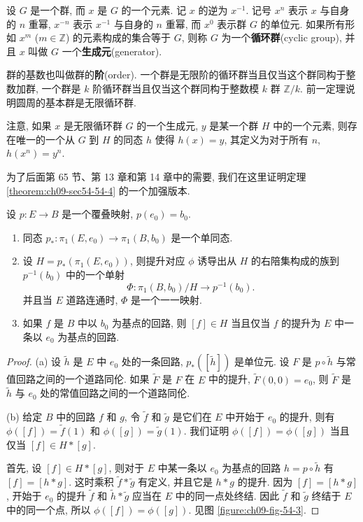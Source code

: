\begin{definition}[循环群]
\label{definition:ch09-sec54-cyclic}
设 $G$ 是一个群, 而 $x$ 是 $G$ 的一个元素. 记 $x$ 的逆为 $x^{-1}$. 记号 $x^n$ 表示 $x$ 与自身的 $n$ 重幂, $x^{-n}$ 表示 $x^{-1}$ 与自身的 $n$ 重幂, 而 $x^0$ 表示群 $G$ 的单位元. 如果所有形如 $x^m$ ($m\in\mathbb{Z}$) 的元素构成的集合等于 $G$, 则称 $G$ 为一个\textbf{循环群}(cyclic group), 并且 $x$ 叫做 $G$ 一个\textbf{生成元}(generator).
\end{definition}

群的基数也叫做群的\textbf{阶}(order). 一个群是无限阶的循环群当且仅当这个群同构于整数加群, 一个群是 $k$ 阶循环群当且仅当这个群同构于整数模 $k$ 群 $\mathbb{Z}/k$. 前一定理说明圆周的基本群是无限循环群.

注意, 如果 $x$ 是无限循环群 $G$ 的一个生成元, $y$ 是某一个群 $H$ 中的一个元素, 则存在唯一的一个从 $G$ 到 $H$ 的同态 $h$ 使得 $h(x)=y$, 其定义为对于所有 $n$, $h(x^n)=y^n$.

为了后面第 65 节、第 13 章和第 14 章中的需要, 我们在这里证明定理 \cref{theorem:ch09-sec54-54-4} 的一个加强版本.

\begin{theorem}
\label{theorem:ch09-sec54-54-6}
设 $p\colon E\to B$ 是一个覆叠映射, $p(e_0)=b_0$.
\begin{enumerate}
\item 同态 $p_*\colon\pi_1(E,e_0)\to\pi_1(B,b_0)$ 是一个单同态.
\item 设 $H=p_*(\pi_1(E,e_0))$, 则提升对应 $\phi$ 诱导出从 $H$ 的右陪集构成的族到 $p^{-1}(b_0)$ 中的一个单射
\[
\Phi\colon\pi_{1}(B,b_{0})/H\longrightarrow p^{-1}(b_{0}).
\]
并且当 $E$ 道路连通时, $\Phi$ 是一个一一映射.
\item 如果 $f$ 是 $B$ 中以 $b_0$ 为基点的回路, 则 $[f]\in H$ 当且仅当 $f$ 的提升为 $E$ 中一条以 $e_0$ 为基点的回路.
\end{enumerate}
\end{theorem}


\begin{proof}
(a) 设 $\tilde{h}$ 是 $E$ 中 $e_0$ 处的一条回路, $p_*([\tilde{h}])$ 是单位元. 设 $F$ 是 $p\circ\tilde{h}$ 与常值回路之间的一个道路同伦. 如果 $\widetilde{F}$ 是 $F$ 在 $E$ 中的提升, $\widetilde{F}(0,0)=e_0$, 则 $\widetilde{F}$ 是 $\tilde{h}$ 与 $e_0$ 处的常值回路之间的一个道路同伦.

(b) 给定 $B$ 中的回路 $f$ 和 $g$, 令 $\tilde{f}$ 和 $\tilde{g}$ 是它们在 $E$ 中开始于 $e_0$ 的提升, 则有 $\phi([f])=\tilde{f}(1)$ 和 $\phi([g])=\tilde{g}(1)$. 我们证明 $\phi([f])=\phi([g])$ 当且仅当 $[f]\in H*[g]$.

首先, 设 $[f]\in H*[g]$, 则对于 $E$ 中某一条以 $e_0$ 为基点的回路 $h=p\circ\tilde{h}$ 有 $[f]=[h*g]$. 这时乘积 $\tilde{f}*\tilde{g}$ 有定义, 并且它是 $h*g$ 的提升. 因为 $[f]=[h*g]$, 开始于 $e_0$ 的提升 $\tilde{f}$ 和 $\tilde{h}*\tilde{g}$ 应当在 $E$ 中的同一点处终结. 因此 $\tilde{f}$ 和 $\tilde{g}$ 终结于 $E$ 中的同一个点, 所以 $\phi([f])=\phi([g])$. 见图 \cref{figure:ch09-fig-54-3}.

\end{proof}

